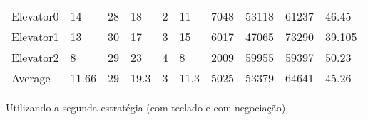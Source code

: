 \documentclass[a4paper]{article}
\begin{document}
\begin{table}[h]
\begin{tabular}{@{}llllllllll@{}}
Elevator0 & 14        & 28            & 18           & 2                                                               & 11                                                                  & 7048                                                         & 53118                                                 & 61237                                                   & 46.45         \\
Elevator1 & 13        & 30            &  17           & 3                                                               & 15                                                                  & 6017                                                         & 47065                                                 & 73290                                                   & 39.105         \\
Elevator2 & 8        & 29            & 23           & 4                                                               & 8                                                                  & 2009                                                         & 59955                                                 & 59397                                                   & 50.23         \\
Average   & 11.66     & 29         & 19.3        & 3                                                              & 11.3                                                            & 5025                                                         & 53379                                                 & 64641                                                   & 45.26         \\ \bottomrule
\end{tabular}
\end{table}

\newpage

Utilizando a segunda estratégia (com teclado e com negociação),
\end{document}
